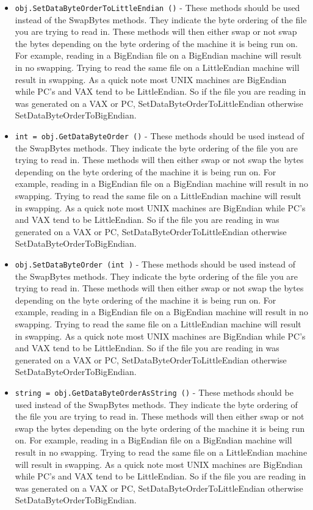 \begin{itemize}
\item  \verb|obj.SetDataByteOrderToLittleEndian ()| -  These methods should be used instead of the SwapBytes methods.
 They indicate the byte ordering of the file you are trying
 to read in. These methods will then either swap or not swap
 the bytes depending on the byte ordering of the machine it is
 being run on. For example, reading in a BigEndian file on a
 BigEndian machine will result in no swapping. Trying to read
 the same file on a LittleEndian machine will result in swapping.
 As a quick note most UNIX machines are BigEndian while PC's
 and VAX tend to be LittleEndian. So if the file you are reading
 in was generated on a VAX or PC, SetDataByteOrderToLittleEndian otherwise
 SetDataByteOrderToBigEndian. 

\item  \verb|int = obj.GetDataByteOrder ()| -  These methods should be used instead of the SwapBytes methods.
 They indicate the byte ordering of the file you are trying
 to read in. These methods will then either swap or not swap
 the bytes depending on the byte ordering of the machine it is
 being run on. For example, reading in a BigEndian file on a
 BigEndian machine will result in no swapping. Trying to read
 the same file on a LittleEndian machine will result in swapping.
 As a quick note most UNIX machines are BigEndian while PC's
 and VAX tend to be LittleEndian. So if the file you are reading
 in was generated on a VAX or PC, SetDataByteOrderToLittleEndian otherwise
 SetDataByteOrderToBigEndian. 

\item  \verb|obj.SetDataByteOrder (int )| -  These methods should be used instead of the SwapBytes methods.
 They indicate the byte ordering of the file you are trying
 to read in. These methods will then either swap or not swap
 the bytes depending on the byte ordering of the machine it is
 being run on. For example, reading in a BigEndian file on a
 BigEndian machine will result in no swapping. Trying to read
 the same file on a LittleEndian machine will result in swapping.
 As a quick note most UNIX machines are BigEndian while PC's
 and VAX tend to be LittleEndian. So if the file you are reading
 in was generated on a VAX or PC, SetDataByteOrderToLittleEndian otherwise
 SetDataByteOrderToBigEndian. 

\item  \verb|string = obj.GetDataByteOrderAsString ()| -  These methods should be used instead of the SwapBytes methods.
 They indicate the byte ordering of the file you are trying
 to read in. These methods will then either swap or not swap
 the bytes depending on the byte ordering of the machine it is
 being run on. For example, reading in a BigEndian file on a
 BigEndian machine will result in no swapping. Trying to read
 the same file on a LittleEndian machine will result in swapping.
 As a quick note most UNIX machines are BigEndian while PC's
 and VAX tend to be LittleEndian. So if the file you are reading
 in was generated on a VAX or PC, SetDataByteOrderToLittleEndian otherwise
 SetDataByteOrderToBigEndian. 


\end{itemize}
